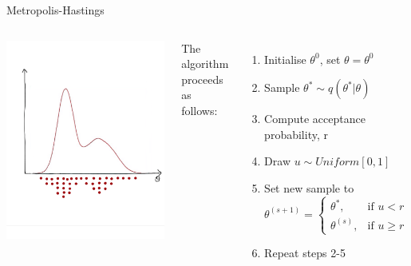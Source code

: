 \documentclass[compress]{beamer}
\begin{document}
\begin{frame}[label=sec-7-13]{Metropolis-Hastings}
    \begin{columns}[c] 
    \includegraphics[width=1\linewidth]{MH6}

    The algorithm proceeds as follows:\\
    \begin{enumerate}
        \item Initialise $\theta^{0}$, set $\theta = \theta^{0}$
        \item Sample $\theta^* \sim q(\theta^*|\theta)$
        \item Compute acceptance probability, r
        \item Draw $u \sim Uniform[0,1]$
        \item Set new sample to 
        \[
           \theta^{(s+1)} = 
           \begin{cases}
            \theta^*, & \text{if } u < r\\
            \theta^{(s)}, & \text{if } u \geqslant r
        \end{cases}
    \]
    \item Repeat steps 2-5
\end{enumerate}
\end{columns}
\end{frame}
\end{document}
